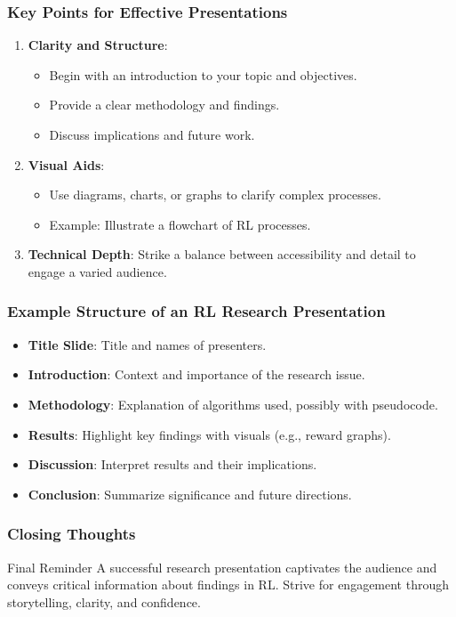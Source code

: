 \documentclass[aspectratio=169]{beamer}
\begin{document}
\begin{frame}[fragile]
    \frametitle{Key Points for Effective Presentations}
    \begin{enumerate}
        \item \textbf{Clarity and Structure}:
            \begin{itemize}
                \item Begin with an introduction to your topic and objectives.
                \item Provide a clear methodology and findings.
                \item Discuss implications and future work.
            \end{itemize}
        \item \textbf{Visual Aids}:
            \begin{itemize}
                \item Use diagrams, charts, or graphs to clarify complex processes.
                \item Example: Illustrate a flowchart of RL processes.
            \end{itemize}
        \item \textbf{Technical Depth}: Strike a balance between accessibility and detail to engage a varied audience.
    \end{enumerate}
\end{frame}

\begin{frame}[fragile]
    \frametitle{Example Structure of an RL Research Presentation}
    \begin{itemize}
        \item \textbf{Title Slide}: Title and names of presenters.
        \item \textbf{Introduction}: Context and importance of the research issue.
        \item \textbf{Methodology}: Explanation of algorithms used, possibly with pseudocode.
        \item \textbf{Results}: Highlight key findings with visuals (e.g., reward graphs).
        \item \textbf{Discussion}: Interpret results and their implications.
        \item \textbf{Conclusion}: Summarize significance and future directions.
    \end{itemize}
\end{frame}

\begin{frame}[fragile]
    \frametitle{Closing Thoughts}
    \begin{block}{Final Reminder}
        A successful research presentation captivates the audience and conveys critical information about findings in RL. Strive for engagement through storytelling, clarity, and confidence.
    \end{block}
\end{frame}
\end{document}
